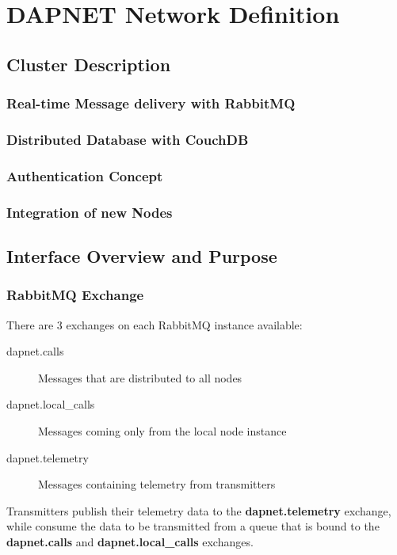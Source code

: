\chapter{DAPNET Network Definition}


\section{Cluster Description}

\subsection{Real-time Message delivery with RabbitMQ}
\label{dapnetdef:clusterdesc:rabbitmq}

\subsection{Distributed Database with CouchDB}
\label{dapnetdef:clusterdesc:couchdb}

\subsection{Authentication Concept}

\subsection{Integration of new Nodes}


\section{Interface Overview and Purpose}

\subsection{RabbitMQ Exchange}
There are 3 exchanges on each RabbitMQ instance available:
\begin{description}
\item[dapnet.calls] Messages that are distributed to all nodes
\item[dapnet.local\_calls] Messages coming only from the local node instance
\item[dapnet.telemetry] Messages containing telemetry from transmitters
\end{description}

Transmitters publish their telemetry data to the \textbf{dapnet.telemetry}
exchange, while consume the data to be transmitted from a queue that is bound to
the \textbf{dapnet.calls} and \textbf{dapnet.local\_calls} exchanges.


